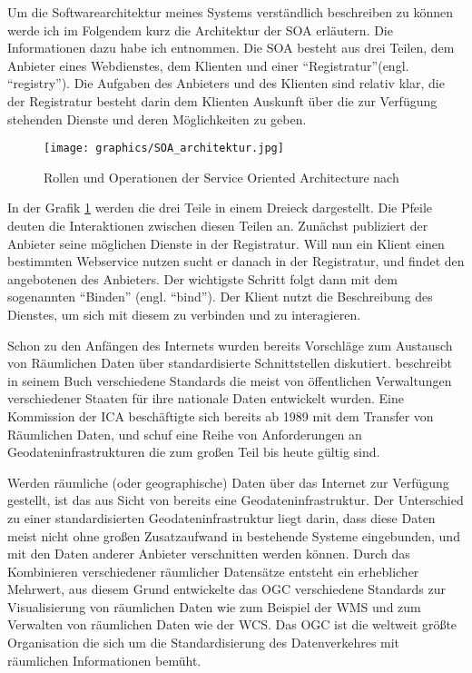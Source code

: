 Um die Softwarearchitektur meines Systems verständlich beschreiben zu können werde ich im Folgendem kurz die Architektur der \gls{SOA} erläutern. Die Informationen dazu habe ich \citep{papazoglou_web_2008} entnommen. Die \gls{SOA} besteht aus drei Teilen, dem Anbieter eines Webdienstes, dem Klienten und einer ``Registratur''(engl. ``registry''). Die Aufgaben des Anbieters und des Klienten sind relativ klar, die der Registratur besteht darin dem Klienten Auskunft über die zur Verfügung stehenden Dienste und deren Möglichkeiten zu geben. 

\begin{figure}[H]
	\centering
 	 \texttt{[image: graphics/SOA\_architektur.jpg]} 
	\caption{Rollen und Operationen der Service Oriented Architecture nach \cite{papazoglou_web_2008}}
	 \label{fig:SOA_architektur}
\end{figure}

In der Grafik \ref{fig:SOA_architektur} werden die drei Teile in einem Dreieck dargestellt. Die Pfeile deuten die Interaktionen zwischen diesen Teilen an. Zunächst publiziert der Anbieter seine möglichen Dienste in der Registratur. Will nun ein Klient einen bestimmten Webservice nutzen sucht er danach in der Registratur, und findet den angebotenen des Anbieters. Der wichtigste Schritt folgt dann mit dem sogenannten ``Binden'' (engl. ``bind''). Der Klient nutzt die Beschreibung des Dienstes, um sich mit diesem zu verbinden und zu interagieren.

Schon zu den Anfängen des Internets wurden bereits Vorschläge zum Austausch von Räumlichen Daten über standardisierte Schnittstellen diskutiert. \citep{moellering_spatial_1997} beschreibt in seinem Buch verschiedene Standards die meist von öffentlichen Verwaltungen verschiedener Staaten für ihre nationale Daten entwickelt wurden. Eine Kommission der \gls{ICA} beschäftigte sich bereits ab 1989 mit dem Transfer von Räumlichen Daten, und schuf eine Reihe von Anforderungen an Geodateninfrastrukturen die zum großen Teil bis heute gültig sind. 

Werden räumliche (oder geographische) Daten über das Internet zur Verfügung gestellt, ist das aus Sicht von \citep{aalders_spatial_2001} bereits eine Geodateninfrastruktur. Der Unterschied zu einer standardisierten Geodateninfrastruktur liegt darin, dass diese Daten meist nicht ohne großen Zusatzaufwand in bestehende Systeme eingebunden, und mit den Daten anderer Anbieter verschnitten werden können. Durch das Kombinieren verschiedener räumlicher Datensätze entsteht ein erheblicher Mehrwert, aus diesem Grund entwickelte das \gls{OGC} verschiedene Standards zur Visualisierung von räumlichen Daten wie zum Beispiel der \gls{WMS} und zum Verwalten von räumlichen Daten wie der \gls{WCS}. Das \gls{OGC} ist die weltweit größte Organisation die sich um die Standardisierung des Datenverkehres mit räumlichen Informationen bemüht. 

